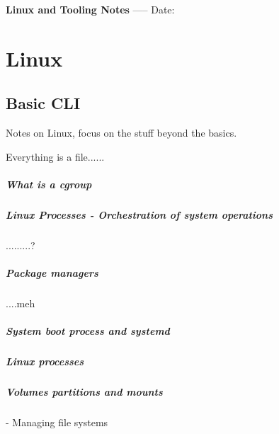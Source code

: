 \documentclass[a4paper, 11pt]{book}
\begin{document}
    \begin{titlepage}
        \centering
        \vspace*{2in}
        \Huge \textbf{Linux and Tooling Notes}
        \vfill
        \Large -----
        \vfill
        \Large Date:%
    \end{titlepage}

    \tableofcontents
    \newpage


    \chapter{Linux}


    \section{Basic CLI}

    Notes on Linux, focus on the stuff beyond the basics.

    Everything is a file......

    \paragraph{What is a cgroup}

    \paragraph{Linux Processes - Orchestration of system operations}
    .........?

    \paragraph{Package managers}
    ....meh

    \paragraph{System boot process and systemd}

    \paragraph{Linux processes}

    \paragraph{Volumes partitions and mounts} - Managing file systems
\end{document}

